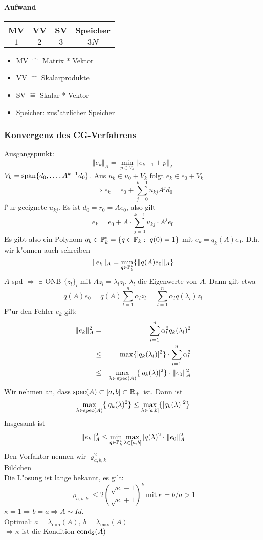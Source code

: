 \documentclass{scrartcl}
\begin{document}
\paragraph*{Aufwand}
\begin{tabular}{c | c | c | c}
MV & VV & SV & Speicher \\
\hline $1$ & $2$ & $3$ & $3N$
\end{tabular}
\begin{itemize}
\item MV $\hat=$ Matrix * Vektor 
\item VV $\hat=$ Skalarprodukte 
\item SV $\hat=$ Skalar * Vektor 
\item Speicher: zus"atzlicher Speicher
\end{itemize}

\subsubsection{Konvergenz des CG-Verfahrens}
Ausgangspunkt:
$$\Vert e_k \Vert_A = \min\limits_{p \in V_k} \Vert e_{k-1} + p \Vert_A$$
$V_k = \mathrm{span} \{ d_0, \ldots, A^{k-1} d_0 \}$. Aus $u_k \in u_0 + V_k$ folgt $e_k \in e_0 + V_k$ 
$$\Rightarrow e_k = e_0 + \sum\limits_{j=0}^{k-1} u_{kj} A^j d_0$$
f"ur geeignete $u_{kj}$. Es ist $d_0 = r_0 = Ae_0$, also gilt
$$e_k = e_0 + A\cdot \sum\limits_{j=0}^{k-1} u_{kj} \cdot A^j e_0$$
Es gibt also ein Polynom $q_k \in \mathbb{P}_k^* = \{ q \in \mathbb{P}_k: \ q(0) = 1 \}$ mit $e_k = q_k(A) e_0$. D.h. wir k"onnen auch schreiben
$$ \Vert e_k \Vert_A = \min\limits_{q \in \mathbb{P}_k^*} \{ \Vert q(A) e_0 \Vert_A \}$$
$A$ spd $\Rightarrow$ $\exists$ ONB $\{ z_l \}_l$ mit $A z_l = \lambda_l z_l$, $\lambda_l$ die Eigenwerte von $A$. Dann gilt etwa
$$ q(A) e_0 = q(A) \sum\limits_{l=1}^n \alpha_l z_l = \sum\limits_{l=1}^n \alpha_l q(\lambda_l) z_l$$
F"ur den Fehler $e_k$ gilt:
\begin{eqnarray*}
\Vert e_k \Vert_A^2 & = & \sum\limits_{l=1}^n \alpha_l^2 q_k(\lambda_l)^2 \\
& \leq & \max \{ \vert q_k(\lambda_l) \vert^2 \} \cdot \sum\limits_{l=1}^n \alpha_l^2 \\
& \leq & \max\limits_{\lambda \in \, \mathrm{spec}(A)} \{ \vert q_k(\lambda) \vert^2 \} \cdot \Vert e_0 \Vert_A^2
\end{eqnarray*}
Wir nehmen an, dass $\mathrm{spec}(A) \subset [a,b] \subset \mathbb{R}_+$ ist. Dann ist 
$$\max\limits_{\lambda \in \mathrm{spec}(A)} \{ \vert q_k (\lambda)^2 \} \leq \max\limits_{\lambda \in [a,b]} \{ \vert q_k(\lambda) \vert^2 \}$$
Insgesamt ist
$$ \Vert e_k \Vert_A^2 \leq \min\limits_{q \in \mathbb{P}_k^*} \max\limits_{\lambda \in [a,b]} \vert q(\lambda)^2 \cdot \Vert e_0 \Vert_A^2$$
Den Vorfaktor nennen wir $\varrho^2_{a,b,k}$ \\
Bildchen \\
Die L"osung ist lange bekannt, es gilt:
$$\varrho_{a,b,k} \leq 2 \left( \frac{ \sqrt{\kappa} - 1}{ \sqrt{\kappa} + 1} \right)^k \mathrm{ \ mit \ } \kappa = b/a > 1$$
$\kappa = 1 \Rightarrow b=a \Rightarrow A \sim Id$. \\
Optimal: $a = \lambda_\mathrm{min}(A), \ b = \lambda_\mathrm{max}(A)$ \\
$\Rightarrow \kappa$ ist die Kondition $\mathrm{cond}_2(A)$
\end{document}
